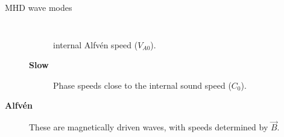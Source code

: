 \documentclass[t]{beamer}
\begin{document}
\begin{frame}[t]
\begin{block}{}
\begin{columns}
\begin{block}{MHD wave modes}
\begin{columns}
\begin{description}
\begin{description}
                                internal Alfv\'en speed ($V_{A0}$).
                            \item [\textbf{Slow}] Phase speeds close to the
                                internal sound speed ($C_{0}$).
                        \end{description}
                    \par\vspace{10pt}
                    \item [\textbf{Alfv\'en}] These are magnetically driven waves,
                        with speeds determined by $\vec{B}$.
                \end{description}
            \end{columns}
        \end{block}



\end{columns}
\end{block}
\end{frame}
\end{document}
